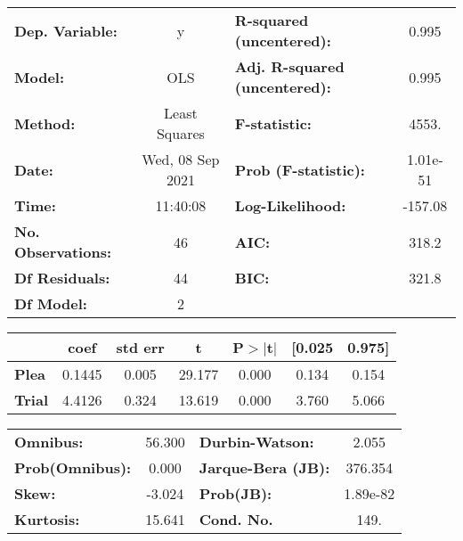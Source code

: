 \begin{center}
\begin{tabular}{lclc}
\toprule
\textbf{Dep. Variable:}    &        y         & \textbf{  R-squared (uncentered):}      &     0.995   \\
\textbf{Model:}            &       OLS        & \textbf{  Adj. R-squared (uncentered):} &     0.995   \\
\textbf{Method:}           &  Least Squares   & \textbf{  F-statistic:       }          &     4553.   \\
\textbf{Date:}             & Wed, 08 Sep 2021 & \textbf{  Prob (F-statistic):}          &  1.01e-51   \\
\textbf{Time:}             &     11:40:08     & \textbf{  Log-Likelihood:    }          &   -157.08   \\
\textbf{No. Observations:} &          46      & \textbf{  AIC:               }          &     318.2   \\
\textbf{Df Residuals:}     &          44      & \textbf{  BIC:               }          &     321.8   \\
\textbf{Df Model:}         &           2      & \textbf{                     }          &             \\
\bottomrule
\end{tabular}
\begin{tabular}{lcccccc}
               & \textbf{coef} & \textbf{std err} & \textbf{t} & \textbf{P$> |$t$|$} & \textbf{[0.025} & \textbf{0.975]}  \\
\midrule
\textbf{Plea}  &       0.1445  &        0.005     &    29.177  &         0.000        &        0.134    &        0.154     \\
\textbf{Trial} &       4.4126  &        0.324     &    13.619  &         0.000        &        3.760    &        5.066     \\
\bottomrule
\end{tabular}
\begin{tabular}{lclc}
\textbf{Omnibus:}       & 56.300 & \textbf{  Durbin-Watson:     } &    2.055  \\
\textbf{Prob(Omnibus):} &  0.000 & \textbf{  Jarque-Bera (JB):  } &  376.354  \\
\textbf{Skew:}          & -3.024 & \textbf{  Prob(JB):          } & 1.89e-82  \\
\textbf{Kurtosis:}      & 15.641 & \textbf{  Cond. No.          } &     149.  \\
\bottomrule
\end{tabular}
\end{center}
